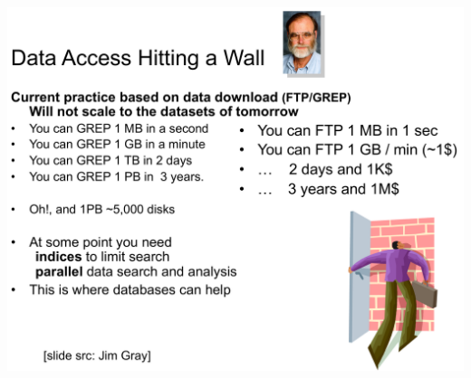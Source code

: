 \documentclass[14pt]{beamer}
\begin{document}
\begin{frame}[plain]
  \includegraphics[width=\textwidth]{img/gray-grep}
\end{frame}
\end{document}
